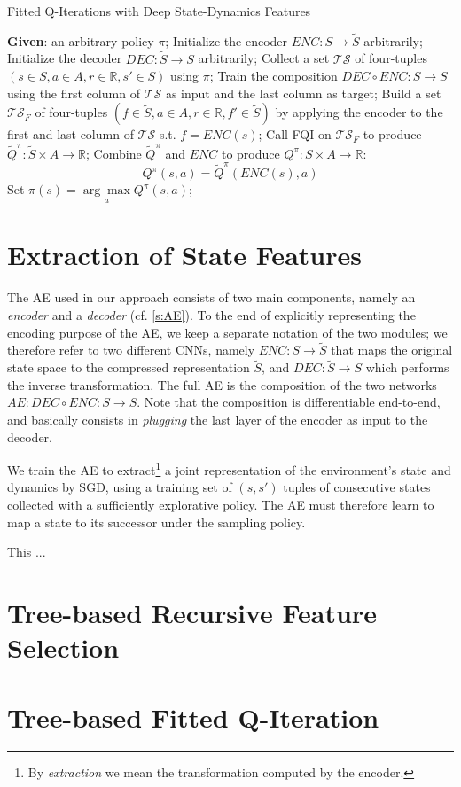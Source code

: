 \begin{algorithm}[h]
    \caption{Fitted Q-Iterations with Deep State-Dynamics Features}
    \label{alg:FQI-DSDF}
    \begin{algorithmic}
	\STATE \textbf{Given}: an arbitrary policy $\pi$;
	\STATE Initialize the encoder $ENC: S \rightarrow \tilde{S}$ arbitrarily;
	\STATE Initialize the decoder $DEC: \tilde{S} \rightarrow S$ arbitrarily;
	\REPEAT 
	    \STATE Collect a set $\mathcal{TS}$ of four-tuples $(s \in S, a \in A, r \in \mathbb{R}, s' \in S)$ using $\pi$;
	    \STATE Train the composition $DEC \circ ENC: S \rightarrow S$ using the first column of $\mathcal{TS}$ as input and the last column as target;
	    \STATE Build a set $\mathcal{TS}_F$ of four-tuples $(f \in \tilde{S}, a \in A, r \in \mathbb{R}, f' \in \tilde{S})$ by applying the encoder to the first and last column of $\mathcal{TS}$ s.t. $f = ENC(s)$;
	    \STATE Call FQI on $\mathcal{TS}_F$ to produce $\tilde{Q}^\pi: \tilde{S} \times A \rightarrow \mathbb{R}$;
	    \STATE Combine $\tilde{Q}^\pi$ and $ENC$ to produce $Q^\pi: S \times A \rightarrow \mathbb{R}$:
		\[
		Q^\pi(s, a) = \tilde{Q}^\pi(ENC(s), a)
		\]
	    \STATE Set $\pi(s) = \underset{a}{\arg\max} Q^{\pi}(s, a)$;
    \end{algorithmic}
\end{algorithm}
%
\section{Extraction of State Features}
The AE used in our approach consists of two main components, namely an 
\textit{encoder} and a \textit{decoder} (cf. \ref{s:AE}). To the end of 
explicitly representing the encoding purpose of the AE, we keep a separate 
notation of the two modules; we therefore refer to two different CNNs, namely 
$ENC: S \rightarrow \tilde{S}$ that maps the original state space to the 
compressed representation $\tilde{S}$, and $DEC: \tilde{S} \rightarrow S$ which
performs the inverse transformation. The full AE is the composition of the two 
networks $AE: DEC \circ ENC: S \rightarrow S$. Note that the composition is 
differentiable end-to-end, and basically consists in \textit{plugging} the last
layer of the encoder as input to the decoder. 

We train the AE to extract\footnote{By \textit{extraction} we mean the 
transformation computed by the encoder.} a joint representation of the 
environment's state and dynamics by SGD, using a training set of $(s, s')$ 
tuples of consecutive states collected with a sufficiently explorative policy. 
The AE must therefore learn to map a state to its successor under the sampling 
policy. 

This ...

\section{Tree-based Recursive Feature Selection}

\section{Tree-based Fitted Q-Iteration}
